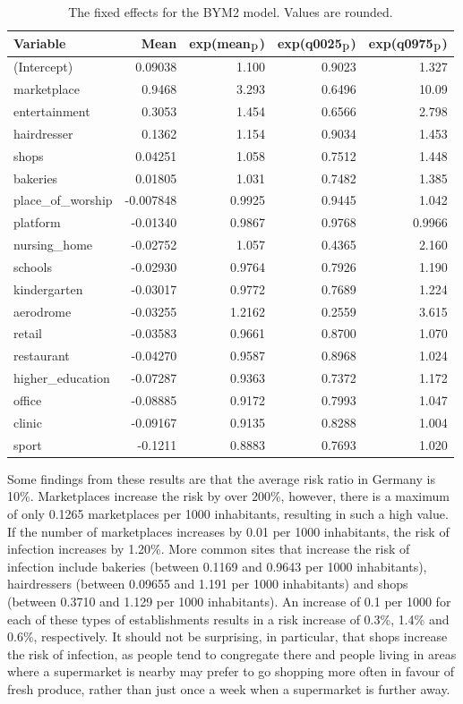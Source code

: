 \begin{table}[H] 
\caption{The fixed effects for the BYM2 model. Values are rounded. \label{fixedInfraGermany}}
\begin{tabular}{l r r r r}
\toprule
\textbf{Variable}	& \textbf{Mean}	& \textbf{exp(mean$_{\hbox{p}}$)} & \textbf{exp(q0025$_{\hbox{p}}$)} & \textbf{exp(q0975$_{\hbox{p}}$)} \\
\midrule
(Intercept) & 0.09038 & 1.100 & 0.9023 & 1.327\\
marketplace & 0.9468 & 3.293  & 0.6496  & 10.09 \\
entertainment & 0.3053 & 1.454 & 0.6566 & 2.798\\
hairdresser & 0.1362 & 1.154 & 0.9034 & 1.453\\
shops & 0.04251 & 1.058 & 0.7512 & 1.448\\
bakeries & 0.01805 & 1.031 & 0.7482 & 1.385\\
place\_of\_worship & -0.007848 & 0.9925 & 0.9445 & 1.042\\
platform & -0.01340 & 0.9867 & 0.9768 & 0.9966\\
nursing\_home & -0.02752 & 1.057 & 0.4365 & 2.160\\
schools & -0.02930 & 0.9764 & 0.7926 & 1.190\\
kindergarten & -0.03017 & 0.9772 & 0.7689 & 1.224\\
aerodrome & -0.03255 & 1.2162 & 0.2559 & 3.615\\
retail & -0.03583 & 0.9661 & 0.8700 & 1.070\\
restaurant & -0.04270 & 0.9587 & 0.8968 & 1.024\\
higher\_education & -0.07287 & 0.9363 & 0.7372 & 1.172\\
office & -0.08885  & 0.9172 & 0.7993 & 1.047\\
clinic & -0.09167 & 0.9135 & 0.8288 & 1.004\\
sport & -0.1211  & 0.8883 & 0.7693 & 1.020\\
\bottomrule
\end{tabular}
\end{table}
Some findings from these results are that the average risk ratio in Germany is 10\%. Marketplaces increase the risk by over 200\%, however, there is a maximum of only 0.1265 marketplaces per 1000 inhabitants, resulting in such a high value. If the number of marketplaces increases by 0.01 per 1000 inhabitants, the risk of infection increases by 1.20\%. More common sites that increase the risk of infection include bakeries (between 0.1169 and 0.9643 per 1000 inhabitants), hairdressers (between 0.09655 and 1.191 per 1000 inhabitants) and shops (between 0.3710 and 1.129 per 1000 inhabitants). An increase of 0.1 per 1000 for each of these types of establishments results in a risk increase of 0.3\%, 1.4\% and 0.6\%, respectively. It should not be surprising, in particular, that shops increase the risk of infection, as people tend to congregate there and people living in areas where a supermarket is nearby may prefer to go shopping more often in favour of fresh produce, rather than just once a week when a supermarket is further away. \\

